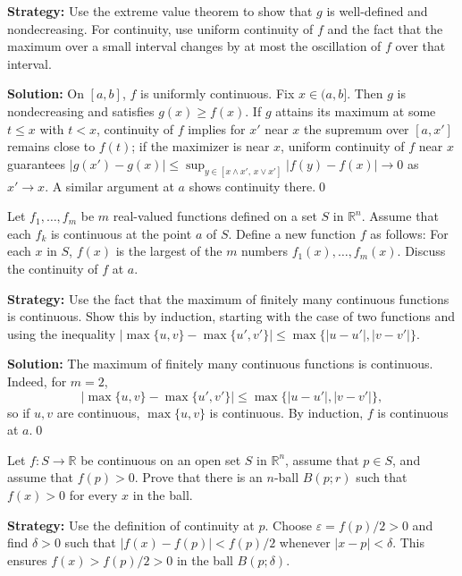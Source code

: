 \noindent\textbf{Strategy:} Use the extreme value theorem to show that $g$ is well-defined and nondecreasing. For continuity, use uniform continuity of $f$ and the fact that the maximum over a small interval changes by at most the oscillation of $f$ over that interval.

\bigskip\noindent\textbf{Solution:}
On $[a,b]$, $f$ is uniformly continuous. Fix $x\in(a,b]$. Then $g$ is nondecreasing and satisfies $g(x)\ge f(x)$. If $g$ attains its maximum at some $t\le x$ with $t<x$, continuity of $f$ implies for $x'$ near $x$ the supremum over $[a,x']$ remains close to $f(t)$; if the maximizer is near $x$, uniform continuity of $f$ near $x$ guarantees $|g(x')-g(x)|\le \sup_{y\in[x\wedge x',\,x\vee x']}|f(y)-f(x)|\to 0$ as $x'\to x$. A similar argument at $a$ shows continuity there.\qed



\begin{problembox}
Let \( f_1, \ldots, f_m \) be \( m \) real-valued functions defined on a set \( S \) in \( \mathbb{R}^n \). Assume that each \( f_k \) is continuous at the point \( a \) of \( S \). Define a new function \( f \) as follows: For each \( x \) in \( S \), \( f(x) \) is the largest of the \( m \) numbers \( f_1(x), \ldots, f_m(x) \). Discuss the continuity of \( f \) at \( a \).
\end{problembox}

\noindent\textbf{Strategy:} Use the fact that the maximum of finitely many continuous functions is continuous. Show this by induction, starting with the case of two functions and using the inequality $|\max\{u,v\} - \max\{u',v'\}| \leq \max\{|u-u'|, |v-v'|\}$.

\bigskip\noindent\textbf{Solution:}
The maximum of finitely many continuous functions is continuous. Indeed, for $m=2$,
\[
|\max\{u,v\}-\max\{u',v'\}|\le \max\{|u-u'|,|v-v'|\},
\]
so if $u,v$ are continuous, $\max\{u,v\}$ is continuous. By induction, $f$ is continuous at $a$.\qed



\begin{problembox}
Let \( f: S \to \mathbb{R} \) be continuous on an open set \( S \) in \( \mathbb{R}^n \), assume that \( p \in S \), and assume that \( f(p) > 0 \). Prove that there is an \( n \)-ball \( B(p; r) \) such that \( f(x) > 0 \) for every \( x \) in the ball.
\end{problembox}

\noindent\textbf{Strategy:} Use the definition of continuity at $p$. Choose $\varepsilon = f(p)/2 > 0$ and find $\delta > 0$ such that $|f(x) - f(p)| < f(p)/2$ whenever $|x-p| < \delta$. This ensures $f(x) > f(p)/2 > 0$ in the ball $B(p;\delta)$.

